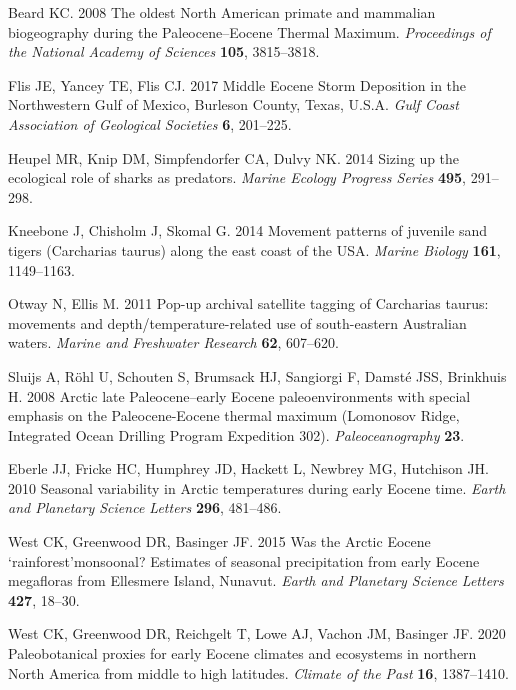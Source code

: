 \documentclass[]{rsos}%
\begin{document}
\begin{thebibliography}{99}
Beard KC. 2008  The oldest North American primate and mammalian biogeography
  during the Paleocene--Eocene Thermal Maximum. {\em Proceedings of the
  National Academy of Sciences} \textbf{105}, 3815--3818.

Flis JE, Yancey TE, Flis CJ. 2017  {Middle Eocene Storm Deposition in the
  Northwestern Gulf of Mexico, Burleson County, Texas, U.S.A}. {\em Gulf Coast
  Association of Geological Societies} \textbf{6}, 201--225.

Heupel MR, Knip DM, Simpfendorfer CA, Dulvy NK. 2014  Sizing up the ecological
  role of sharks as predators. {\em Marine Ecology Progress Series}
  \textbf{495}, 291--298.

Kneebone J, Chisholm J, Skomal G. 2014  Movement patterns of juvenile sand
  tigers (Carcharias taurus) along the east coast of the USA. {\em Marine
  Biology} \textbf{161}, 1149--1163.

Otway N, Ellis M. 2011  Pop-up archival satellite tagging of Carcharias taurus:
  movements and depth/temperature-related use of south-eastern Australian
  waters. {\em Marine and Freshwater Research} \textbf{62}, 607--620.

Sluijs A, R{\"o}hl U, Schouten S, Brumsack HJ, Sangiorgi F, Damst{\'e} JSS,
  Brinkhuis H. 2008  Arctic late Paleocene--early Eocene paleoenvironments with
  special emphasis on the Paleocene-Eocene thermal maximum (Lomonosov Ridge,
  Integrated Ocean Drilling Program Expedition 302). {\em Paleoceanography}
  \textbf{23}.

Eberle JJ, Fricke HC, Humphrey JD, Hackett L, Newbrey MG, Hutchison JH. 2010
  Seasonal variability in Arctic temperatures during early Eocene time. {\em
  Earth and Planetary Science Letters} \textbf{296}, 481--486.

West CK, Greenwood DR, Basinger JF. 2015  Was the Arctic Eocene
  ‘rainforest’monsoonal? Estimates of seasonal precipitation from early
  Eocene megafloras from Ellesmere Island, Nunavut. {\em Earth and Planetary
  Science Letters} \textbf{427}, 18--30.

West CK, Greenwood DR, Reichgelt T, Lowe AJ, Vachon JM, Basinger JF. 2020
  Paleobotanical proxies for early Eocene climates and ecosystems in northern
  North America from middle to high latitudes. {\em Climate of the Past}
  \textbf{16}, 1387--1410.


\end{thebibliography}
\end{document}
